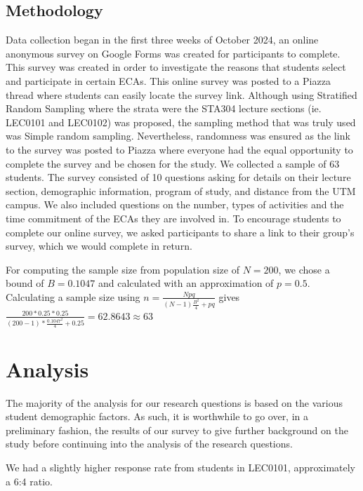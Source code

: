 \documentclass[
  letterpaper,
  DIV=11,
  numbers=noendperiod]{scrartcl}
\begin{document}
\subsection{Methodology}\label{methodology}

Data collection began in the first three weeks of October 2024, an
online anonymous survey on Google Forms was created for participants to
complete. This survey was created in order to investigate the reasons
that students select and participate in certain ECAs. This online survey
was posted to a Piazza thread where students can easily locate the
survey link. Although using Stratified Random Sampling where the strata
were the STA304 lecture sections (ie. LEC0101 and LEC0102) was proposed,
the sampling method that was truly used was Simple random sampling.
Nevertheless, randomness was ensured as the link to the survey was
posted to Piazza where everyone had the equal opportunity to complete
the survey and be chosen for the study. We collected a sample of 63
students. The survey consisted of 10 questions asking for details on
their lecture section, demographic information, program of study, and
distance from the UTM campus. We also included questions on the number,
types of activities and the time commitment of the ECAs they are
involved in. To encourage students to complete our online survey, we
asked participants to share a link to their group's survey, which we
would complete in return.

For computing the sample size from population size of \(N = 200\), we
chose a bound of \(B = 0.1047\) and calculated with an approximation of
\(p = 0.5\). Calculating a sample size using
\(n = \frac{Npq}{(N-1)\frac{B^2}{4}+pq}\) gives
\(\frac{200*0.25*0.25}{(200-1)*\frac{0.1047^2}{4}+0.25} = 62.8643 \approx 63\)

\section{Analysis}\label{sec-data1}

The majority of the analysis for our research questions is based on the
various student demographic factors. As such, it is worthwhile to go
over, in a preliminary fashion, the results of our survey to give
further background on the study before continuing into the analysis of
the research questions.

We had a slightly higher response rate from students in LEC0101,
approximately a 6:4 ratio.
\end{document}
